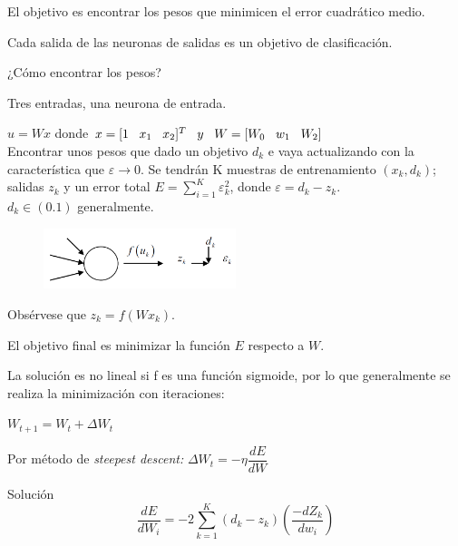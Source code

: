 El objetivo es encontrar los pesos que minimicen el error cuadrático medio.


Cada salida de las neuronas de salidas es un objetivo de clasificación.

\begin{ejemplo}
	
¿Cómo encontrar los pesos?

Tres entradas, una neurona de entrada.

$u=Wx$ donde $x = [1 \hspace{0.3cm} x_1 \hspace{0.3cm}  x_2]^T \hspace{0.3cm} y \hspace{0.3cm} W= [W_0 \hspace{0.3cm} w_1 \hspace{0.3cm} W_2]$
\\

Encontrar unos pesos que dado un objetivo $d_k$ e vaya actualizando con la característica que $\varepsilon \rightarrow 0$. Se
tendrán K muestras de entrenamiento $(x_k,d_k)$; salidas $z_k$ y un error total $E= \sum_{i=1}^{K}  \varepsilon_k^2$, donde $\varepsilon= d_k - z_k$.
\\

$d_k \in (0.1)$ generalmente. 

\end{ejemplo}


\begin{figure}[h!]
	\centering
	\includegraphics[width=0.5\textwidth]{images/img77.png}
	\label{figura77}
\end{figure}

Obsérvese que $z_k = f(Wx_k)$.

El objetivo final es minimizar la función $E$ respecto a $W$. 

La solución es no lineal si f es una función sigmoide, por lo que generalmente se realiza la minimización con
iteraciones:

$ W_{t+1} = W_t + \Delta W_t
$

Por método de \textit{steepest descent:}
$\Delta W_t= -\eta \dfrac{dE}{dW}
$

Solución
\\

$$
\dfrac{dE}{dW_i} = -2  \sum_{k=1}^{K}
(d_k - z_k) (\dfrac{-dZ_k}{dw_i})
$$

